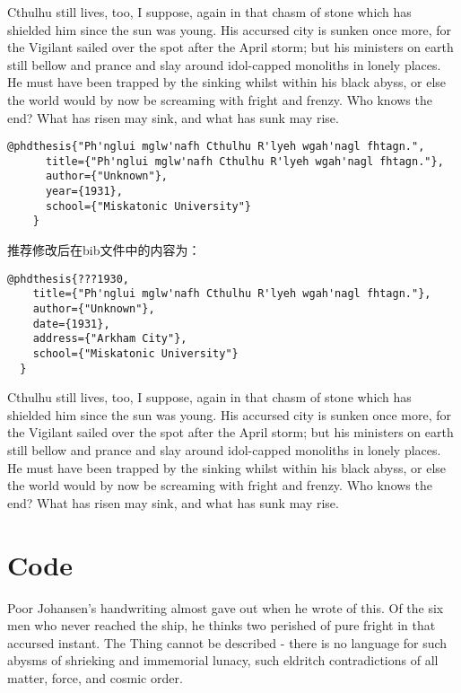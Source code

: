 Cthulhu still lives, too, I suppose, again in that chasm of stone which has shielded him since the sun was young. His accursed city is sunken once more, for the Vigilant sailed over the spot after the April storm; but his ministers on earth still bellow and prance and slay around idol-capped monoliths in lonely places. He must have been trapped by the sinking whilst within his black abyss, or else the world would by now be screaming with fright and frenzy. Who knows the end? What has risen may sink, and what has sunk may rise. 

\begin{lstlisting}[caption={Google Scholar}, label=googlescholar, escapeinside="", numbers=none]
    @phdthesis{"Ph'nglui mglw'nafh Cthulhu R'lyeh wgah'nagl fhtagn.",
      title={"Ph'nglui mglw'nafh Cthulhu R'lyeh wgah'nagl fhtagn."},
      author={"Unknown"},
      year={1931},
      school={"Miskatonic University"}
    } 
\end{lstlisting}

推荐修改后在bib文件中的内容为：

\begin{lstlisting}[caption={Reference}, label=itemok, escapeinside="", numbers=none]
  @phdthesis{???1930,
    title={"Ph'nglui mglw'nafh Cthulhu R'lyeh wgah'nagl fhtagn."},
    author={"Unknown"},
    date={1931},
    address={"Arkham City"},
    school={"Miskatonic University"}
  } 
\end{lstlisting}

Cthulhu still lives, too, I suppose, again in that chasm of stone which has shielded him since the sun was young. His accursed city is sunken once more, for the Vigilant sailed over the spot after the April storm; but his ministers on earth still bellow and prance and slay around idol-capped monoliths in lonely places. He must have been trapped by the sinking whilst within his black abyss, or else the world would by now be screaming with fright and frenzy. Who knows the end? What has risen may sink, and what has sunk may rise. 

\section{Code}

Poor Johansen's handwriting almost gave out when he wrote of this. Of the six men who never reached the ship, he thinks two perished of pure fright in that accursed instant. The Thing cannot be described - there is no language for such abysms of shrieking and immemorial lunacy, such eldritch contradictions of all matter, force, and cosmic order.

